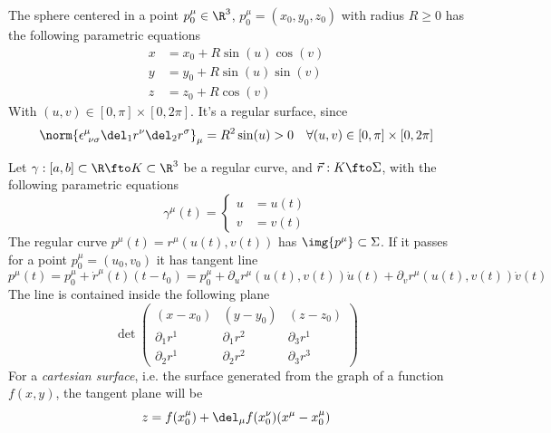 \documentclass[../mmf.tex]{subfiles}
\begin{document}
\begin{eg}
	The sphere centered in a point $p^\mu_0\in\R^3$, $p^\mu_0=(x_0,y_0,z_0)$ with radius $R\ge0$ has the following parametric equations
	\begin{equation}
		\begin{aligned}
			x&=x_0+R\sin(u)\cos(v)\\
			y&=y_0+R\sin(u)\sin(v)\\
			z&=z_0+R\cos(v)
		\end{aligned}
		\label{eq:sphereradiusR}
	\end{equation}
	With $(u,v)\in[0,\pi]\times[0,2\pi]$. It's a regular surface, since
	\begin{equation*}
		\norm{\epsilon^\mu_{\ \nu\sigma}\del_1r^\nu\del_2r^\sigma}_\mu=R^2\sin(u)>0\quad\forall(u,v)\in[0,\pi]\times[0,2\pi]
	\end{equation*}
\end{eg}
\begin{dfn}
	Let $\gamma:[a,b]\subset\R\fto K\subset\R^3$ be a regular curve, and $\vec{r}:K\fto\Sigma$, with the following parametric equations
	\begin{equation}
		\gamma^\mu(t)=\left\{\begin{aligned}u&=u(t)\\v&=v(t)\end{aligned}\right.
		\label{eq:parametricsurfgam}
	\end{equation}
	The regular curve $p^\mu(t)=r^\mu(u(t),v(t))$ has $\img{p^\mu}\subset\Sigma$. If it passes for a point $p^\mu_0=(u_0,v_0)$ it has tangent line
	\begin{equation}
		p^\mu(t)=p^\mu_0+\dot{r}^{\mu}(t)(t-t_0)=p^\mu_0+\partial_ur^\mu(u(t),v(t))\dot{u}(t)+\partial_vr^\mu(u(t),v(t))\dot{v}(t)
		\label{eq:tangline}
	\end{equation}
	The line is contained inside the following plane
	\begin{equation}
		\det\begin{pmatrix}(x-x_0)&(y-y_0)&(z-z_0)\\\partial_1r^1&\partial_1r^2&\partial_3r^1\\\partial_2r^1&\partial_2r^2&\partial_3r^3\end{pmatrix}
		\label{eq:surftanlineplane}
	\end{equation}
	For a \textit{cartesian surface}, i.e. the surface generated from the graph of a function $f(x,y)$, the tangent plane will be
	\begin{equation}
		z=f(x^\mu_0)+\del_\mu f(x^\nu_0)(x^\mu-x^\mu_0)
		\label{eq:cartsurftanplan}
	\end{equation}
\end{dfn}
\end{document}
